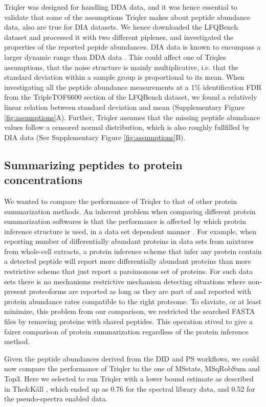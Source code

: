 \documentclass[10pt,letterpaper]{article}
\begin{document}
Triqler was designed for handling DDA data, and it was hence essential to validate that some of the assumptions Triqler makes about peptide abundance data, also are true for DIA datasets.
We hence downloaded the LFQBench dataset and processed it with two different piplenes, and investigated the properties of the reported pepide abundances. DIA data is known to encompass a larger dynamic range than DDA data . This could affect one of Triqles assumptions, that the noise structure is mainly multiplicative, i.e. that the standard deviation within a sample group is proportional to its mean. When investigating all the peptide abundance measurements at a 1\% identification FDR from the TripleTOF6600 section of the LFQBench dataset, we found a relatively linear relation between standard deviation and mean (Supplementary Figure \ref{fig:assumptions}A). Further, Triqler assumes that the missing peptide abundance values follow a censored normal distribution, which is also roughly fullfilled by DIA data (See Supplementary Figure \ref{fig:assumptions}B).


\subsection*{Summarizing peptides to protein concentrations}

We wanted to compare the performance of Triqler to that of other protein summarization methods. An inherent problem when comparing different protein summarization softwares is that the performance is affected by which protein inference structure is used, in a data set dependent manner \cite{serang2012recognizing}. For example, when reporting number of differentially abundant proteins in data sets from mixtures from whole-cell extracts, a protein inference scheme that infer any protein contain a detected peptide will report more differentially abundant proteins than more restrictive scheme that just report a parsimonous set of proteins. For such data sets there is no mechanisms restrictive mechanism detecting situations where non-present proteoforms are reported as long as they are part of and reported with protein abundance rates compatible to the right proteome. To elaviate, or at least minimize, this problem from our comparison, we restricted the searched FASTA files by removing proteins with shared peptides. This operation stived to 
give a fairer comparison of protein summarization regardless of the protein inference method.

Given the peptide abundances derived from the DID and PS workflows, we could now compare the performance of Triqler to the one of MSstats, MSqRobSum and Top3. Here we selected to run Triqler with a lower bound estimate as described in The\&K\"{a}ll \cite{the2021triqler}, which ended up as 0.76 for the spectral library data, and 0.52 for the pseudo-spectra enabled data.
\end{document}
